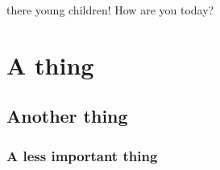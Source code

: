  there young children! How are you today? \blindtext

\chapter{A thing}

\blindtext
\section{Another thing}

\blindtext
\subsection{A less important thing}
\blindtext



